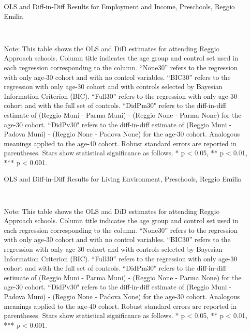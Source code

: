 \begin{landscape}
\begin{table}[H] \caption{OLS and Diff-in-Diff Results for Employment and Income, Preschools, Reggio Emilia} \label{ols-W-reg}
\scalebox{0.76}{
}
\vspace{1ex} \\
\footnotesize\raggedright{Note: This table shows the OLS and DiD estimates for attending Reggio Approach schools. Column title indicates the age group and control set used in each regression corresponding to the column. ``None30'' refers to the regression with only age-30 cohort and with no control variables. ``BIC30'' refers to the regression with only age-30 cohort and with controls selected by Bayesian Information Criterion (BIC). ``Full30'' refers to the regression with only age-30 cohort and with the full set of controls. ``DidPm30" refers to the diff-in-diff estimate of (Reggio Muni - Parma Muni) - (Reggio None - Parma None) for the age-30 cohort. ``DidPv30" refers to the diff-in-diff estimate of (Reggio Muni - Padova Muni) - (Reggio None - Padova None) for the age-30 cohort. Analogous meanings applied to the age-40 cohort. Robust standard errors are reported in parentheses. Stars show statistical significance as follows. * p < 0.05, ** p < 0.01, *** p < 0.001.}
\end{table}


\begin{table}[H] \caption{OLS and Diff-in-Diff Results for Living Environment, Preschools, Reggio Emilia} \label{ols-L-reg}
\scalebox{0.80}{
}
\vspace{1ex} \\
\footnotesize\raggedright{Note: This table shows the OLS and DiD estimates for attending Reggio Approach schools. Column title indicates the age group and control set used in each regression corresponding to the column. ``None30'' refers to the regression with only age-30 cohort and with no control variables. ``BIC30'' refers to the regression with only age-30 cohort and with controls selected by Bayesian Information Criterion (BIC). ``Full30'' refers to the regression with only age-30 cohort and with the full set of controls. ``DidPm30" refers to the diff-in-diff estimate of (Reggio Muni - Parma Muni) - (Reggio None - Parma None) for the age-30 cohort. ``DidPv30" refers to the diff-in-diff estimate of (Reggio Muni - Padova Muni) - (Reggio None - Padova None) for the age-30 cohort. Analogous meanings applied to the age-40 cohort. Robust standard errors are reported in parentheses. Stars show statistical significance as follows. * p < 0.05, ** p < 0.01, *** p < 0.001.}
\end{table}


\end{landscape}
